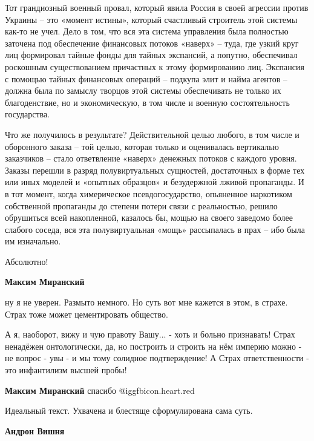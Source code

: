\begin{itemize}
\begin{multicols}{2}
Тот грандиозный военный провал, который явила Россия в своей агрессии против
Украины – это «момент истины», который счастливый строитель этой системы как-то
не учел. Дело в том, что вся эта система управления была полностью заточена под
обеспечение финансовых потоков «наверх» – туда, где узкий круг лиц формировал
тайные фонды для тайных экспансий, а попутно, обеспечивал роскошным
существованием причастных к этому формированию лиц. Экспансия с помощью тайных
финансовых операций – подкупа элит и найма агентов – должна была по замыслу
творцов этой системы обеспечивать не только их благоденствие, но и
экономическую, в том числе и военную состоятельность государства.

Что же получилось в результате? Действительной целью любого, в том числе и
оборонного заказа – той целью, которая только и оценивалась вертикалью
заказчиков – стало ответвление «наверх» денежных потоков с каждого уровня.
Заказы перешли в разряд полувиртуальных сущностей, достаточных в форме тех или
иных моделей и «опытных образцов» и безудержной лживой пропаганды. И в тот
момент, когда химерическое псевдогосударство, опьяненное наркотиком собственной
пропаганды до степени потери связи с реальностью, решило обрушиться всей
накопленной, казалось бы, мощью на своего заведомо более слабого соседа, вся
эта полувиртуальная «мощь» рассыпалась в прах – ибо была им изначально.

\end{multicols} %

Абсолютно!

\begin{itemize} %
\textbf{Максим Миранский} 

ну я не уверен. Размыто немного. Но суть вот мне кажется в этом, в страхе.
Страх тоже может цементировать общество.


А я, наоборот, вижу и чую правоту Вашу... - хоть и больно признавать! Страх
ненадёжен онтологически, да, но построить и строить на нём империю можно - не
вопрос - увы - и мы тому солидное подтверждение! А Страх ответственности - это
инфантилизм высшей пробы!

\textbf{Максим Миранский} спасибо @igg{fbicon.heart.red}
\end{itemize} %

Идеальный текст. Ухвачена и блестяще сформулирована сама суть.

\begin{itemize} %
\textbf{Андрон Вишня} 


\end{itemize}
\end{itemize}
